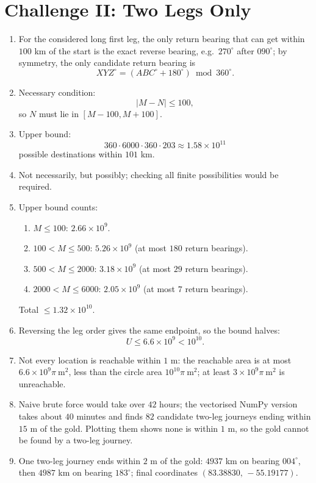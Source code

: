 \documentclass{article}
\begin{document}
\section*{Challenge II: Two Legs Only}
\begin{enumerate}
\item For the considered long first leg, the only return bearing that can get within \(100\) km of the start is the exact reverse bearing, e.g.\ \(270^\circ\) after \(090^\circ\); by symmetry, the only candidate return bearing is
\[
XYZ^\circ=(ABC^\circ+180^\circ)\bmod 360^\circ.
\]

\item Necessary condition:
\[
|M-N|\le 100,
\]
so \(N\) must lie in \([M-100,M+100]\).

\item Upper bound:
\[
360\cdot6000\cdot360\cdot203 \approx 1.58\times10^{11}
\]
possible destinations within \(101\) km.

\item Not necessarily, but possibly; checking all finite possibilities would be required.

\item Upper bound counts:
\begin{enumerate}
\item \(M\le100\): \(2.66\times10^9\).
\item \(100<M\le500\): \(5.26\times10^9\) (at most \(180\) return bearings).
\item \(500<M\le2000\): \(3.18\times10^9\) (at most \(29\) return bearings).
\item \(2000<M\le6000\): \(2.05\times10^9\) (at most \(7\) return bearings).
\end{enumerate}
Total \(\le 1.32\times10^{10}\).

\item Reversing the leg order gives the same endpoint, so the bound halves:
\[
U\le 6.6\times10^9<10^{10}.
\]

\item Not every location is reachable within \(1\) m: the reachable area is at most \(6.6\times10^9\pi\ \text{m}^2\), less than the circle area \(10^{10}\pi\ \text{m}^2\); at least \(3\times10^9\pi\ \text{m}^2\) is unreachable.

\item Naive brute force would take over \(42\) hours; the vectorised NumPy version takes about \(40\) minutes and finds \(82\) candidate two-leg journeys ending within \(15\) m of the gold. Plotting them shows none is within \(1\) m, so the gold cannot be found by a two-leg journey.

\item One two-leg journey ends within \(2\) m of the gold: \(4937\) km on bearing \(004^\circ\), then \(4987\) km on bearing \(183^\circ\); final coordinates \((83.38830,\,-55.19177)\).
\end{enumerate}
\end{document}
